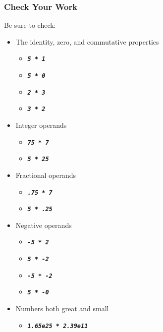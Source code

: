 \subsubsection*{Check Your Work}

\begin{description}
\end{description}
Be sure to check:
\begin{itemize}
    \item The identity, zero, and commutative properties
    \begin{itemize}
        \item[] \texttt{\textbf{\textit{5 * 1}}}
        \item[] \texttt{\textbf{\textit{5 * 0}}}
        \item[] \texttt{\textbf{\textit{2 * 3}}}
        \item[] \texttt{\textbf{\textit{3 * 2}}}
    \end{itemize}
    \item Integer operands
    \begin{itemize}
        \item[] \texttt{\textbf{\textit{75 * 7}}}
        \item[] \texttt{\textbf{\textit{5 * 25}}}
    \end{itemize}
    \item Fractional operands
    \begin{itemize}
        \item[] \texttt{\textbf{\textit{.75 * 7}}}
        \item[] \texttt{\textbf{\textit{5 * .25}}}
    \end{itemize}
    \item Negative operands
    \begin{itemize}
        \item[] \texttt{\textbf{\textit{-5 * 2}}}
        \item[] \texttt{\textbf{\textit{5 * -2}}}
        \item[] \texttt{\textbf{\textit{-5 * -2}}}
        \item[] \texttt{\textbf{\textit{5 * -0}}}
    \end{itemize}
    \item Numbers both great and small
    \begin{itemize}
        \item[] \texttt{\textbf{\textit{1.65e25 * 2.39e11}}}

\end{itemize}
\end{itemize}
